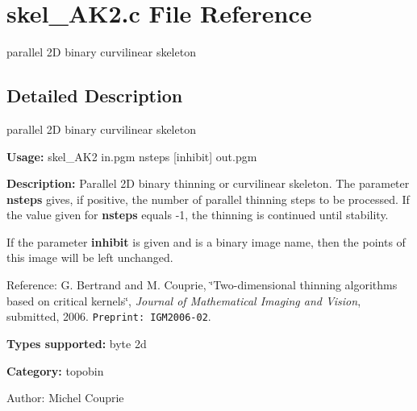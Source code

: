 \section{skel\_\-AK2.c File Reference}
\label{skel__AK2_8c}
parallel 2D binary curvilinear skeleton 



\subsection{Detailed Description}
parallel 2D binary curvilinear skeleton 

{\bf Usage:} skel\_\-AK2 in.pgm nsteps [inhibit] out.pgm

{\bf Description:} Parallel 2D binary thinning or curvilinear skeleton. The parameter {\bf nsteps} gives, if positive, the number of parallel thinning steps to be processed. If the value given for {\bf nsteps} equals -1, the thinning is continued until stability.

If the parameter {\bf inhibit} is given and is a binary image name, then the points of this image will be left unchanged.

Reference: G. Bertrand and M. Couprie, \char`\"{}Two-dimensional thinning algorithms based on critical kernels\char`\"{}, {\em  Journal of Mathematical Imaging and Vision\/}, submitted, 2006. {\tt Preprint: IGM2006-02}.

{\bf Types supported:} byte 2d

{\bf Category:} topobin

\begin{Desc}
\item[Author:]Michel Couprie \end{Desc}
